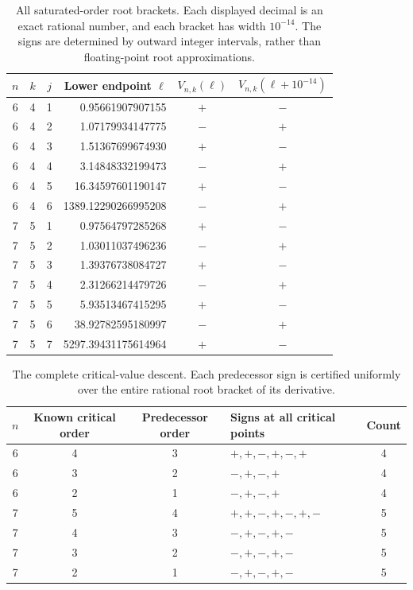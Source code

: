 \begin{table}[htbp]
\centering\small
\begin{tabular}{cccrcc}
\toprule
$n$&$k$&$j$&Lower endpoint $\ell$&$V_{n,k}(\ell)$&$V_{n,k}(\ell+10^{-14})$\\
\midrule
6&4&1&0.95661907907155&$+$&$-$\\
6&4&2&1.07179934147775&$-$&$+$\\
6&4&3&1.51367699674930&$+$&$-$\\
6&4&4&3.14848332199473&$-$&$+$\\
6&4&5&16.34597601190147&$+$&$-$\\
6&4&6&1389.12290266995208&$-$&$+$\\
7&5&1&0.97564797285268&$+$&$-$\\
7&5&2&1.03011037496236&$-$&$+$\\
7&5&3&1.39376738084727&$+$&$-$\\
7&5&4&2.31266214479726&$-$&$+$\\
7&5&5&5.93513467415295&$+$&$-$\\
7&5&6&38.92782595180997&$-$&$+$\\
7&5&7&5297.39431175614964&$+$&$-$\\
\bottomrule
\end{tabular}
\caption{All saturated-order root brackets. Each displayed decimal is an
exact rational number, and each bracket has width $10^{-14}$. The signs
are determined by outward integer intervals, rather than floating-point
root approximations.}
\label{higherzeros:tab:terminal}
\end{table}

\begin{table}[htbp]
\centering\small
\begin{tabular}{ccclc}
\toprule
$n$&Known critical order&Predecessor order&Signs at all critical points&Count\\
\midrule
6&4&3&$+,+,-,+,-,+$&4\\
6&3&2&$-,+,-,+$&4\\
6&2&1&$-,+,-,+$&4\\
\midrule
7&5&4&$+,+,-,+,-,+,-$&5\\
7&4&3&$-,+,-,+,-$&5\\
7&3&2&$-,+,-,+,-$&5\\
7&2&1&$-,+,-,+,-$&5\\
\bottomrule
\end{tabular}
\caption{The complete critical-value descent. Each predecessor sign is
certified uniformly over the entire rational root bracket of its derivative.}
\label{higherzeros:tab:descent}
\end{table}

